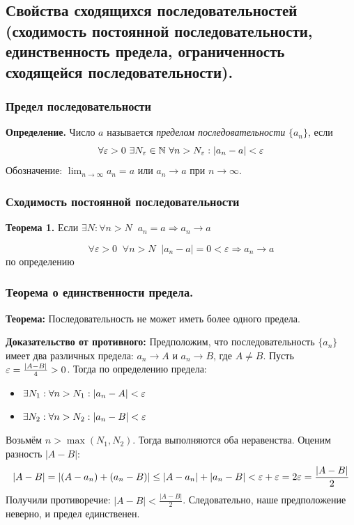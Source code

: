 \subsection{Свойства сходящихся последовательностей (сходимость постоянной последовательности, единственность предела, ограниченность сходящейся последовательности).}

\subsubsection{Предел последовательности}
\begin{tcolorbox}
\textbf{Определение.} Число $a$ называется \textit{пределом последовательности} $\{a_n\}$, если
$$\forall \varepsilon > 0\ \exists N_\varepsilon \in \mathbb{N}\ \forall n > N_\varepsilon: |a_n - a| < \varepsilon$$
Обозначение: $\lim_{n\to\infty} a_n = a$ или $a_n \to a$ при $n \to \infty$.
\end{tcolorbox}

\subsubsection{Сходимость постоянной последовательности}
\begin{tcolorbox}
    \textbf{Теорема 1.} Если $\exists N: \forall n > N \;\; a_n = a \Rightarrow a_n\to a$
\end{tcolorbox}
\begin{tcolorbox}[title=Доказательство]
    \[ \forall \varepsilon>0 \;\;\forall n>N \;\; |a_n - a| = 0 < \varepsilon \Rightarrow a_n\to a\] по определению 
\end{tcolorbox}

\subsubsection{Теорема о единственности предела.}
\textbf{Теорема:} Последовательность не может иметь более одного предела.

\begin{tcolorbox}[title=Доказательство теоремы, breakable]
\textbf{Доказательство от противного:}
Предположим, что последовательность $\{a_n\}$ имеет два различных предела: $a_n \to A$ и $a_n \to B$, где $A \neq B$.
Пусть $\varepsilon = \frac{|A - B|}{4} > 0$. Тогда по определению предела:
\begin{itemize}
    \item $\exists N_1: \forall n > N_1: |a_n - A| < \varepsilon$
    \item $\exists N_2: \forall n > N_2: |a_n - B| < \varepsilon$
\end{itemize}
Возьмём $n > \max(N_1, N_2)$. Тогда выполняются оба неравенства. Оценим разность $|A - B|$:
$$|A - B| = |(A - a_n) + (a_n - B)| \leq |A - a_n| + |a_n - B| < \varepsilon + \varepsilon = 2\varepsilon = \frac{|A - B|}{2}$$
Получили противоречие: $|A - B| < \frac{|A - B|}{2}$. Следовательно, наше предположение неверно, и предел единственен.
\end{tcolorbox}


